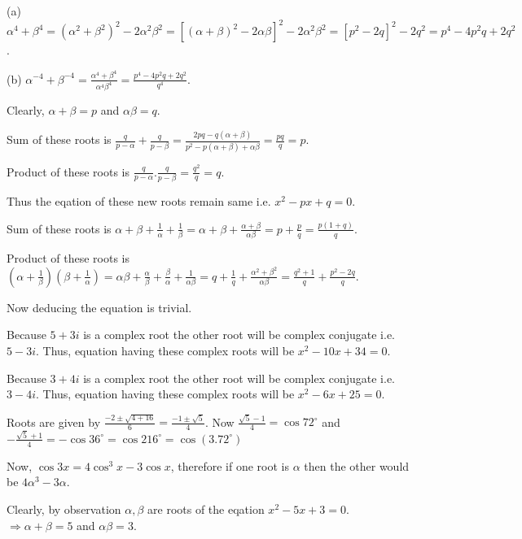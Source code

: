   (a) $\alpha^4 + \beta^4 = (\alpha^2 + \beta^2)^2 - 2\alpha^2\beta^2 = [(\alpha + \beta)^2 - 2\alpha\beta]^2
  - 2\alpha^2\beta^2 = [p^2 - 2q]^2 - 2q^2 = p^4 - 4p^2q + 2q^2$.

  (b) $\alpha^{-4} + \beta^{-4} = \frac{\alpha^4 + \beta^4}{\alpha^4\beta^4} = \frac{p^4 - 4p^2q +
    2q^2}{q^4}$.
\item Clearly, $\alpha + \beta = p$ and $\alpha\beta = q$.
  \startitemize[i]
  \item Sum of these roots is $\frac{q}{p - \alpha} + \frac{q}{p - \beta} = \frac{2pq - q(\alpha +
    \beta)}{p^2 - p(\alpha + \beta) + \alpha\beta} = \frac{pq}{q} = p$.

    Product of these roots is $\frac{q}{p - \alpha}.\frac{q}{p - \beta} = \frac{q^2}{q} = q$.

    Thus the eqation of these new roots remain same i.e. $x^2 - px + q = 0$.
  \item Sum of these roots is $\alpha + \beta + \frac{1}{\alpha} + \frac{1}{\beta} = \alpha + \beta +
    \frac{\alpha + \beta}{\alpha\beta} = p + \frac{p}{q} = \frac{p(1 + q)}{q}$.

    Product of these roots is $\left(\alpha + \frac{1}{\beta}\right)\left(\beta + \frac{1}{\alpha}\right) =
    \alpha\beta + \frac{\alpha}{\beta} + \frac{\beta}{\alpha} + \frac{1}{\alpha\beta} = q + \frac{1}{q} +
    \frac{\alpha^2 + \beta^2}{\alpha\beta} = \frac{q^2 + 1}{q} + \frac{p^2 - 2q}{q}$.

    Now deducing the equation is trivial.
  \stopitemize
\item Because $5 + 3i$ is a complex root the other root will be complex conjugate i.e. $5 - 3i$. Thus,
  equation having these complex roots will be $x^2 - 10x + 34 = 0$.
\item Because $3 + 4i$ is a complex root the other root will be complex conjugate i.e. $3 - 4i$. Thus,
  equation having these complex roots will be $x^2 - 6x + 25 = 0$.
\item Roots are given by $\frac{-2\pm\sqrt{4 + 16}}{6} = \frac{-1\pm\sqrt{5}}{4}$. Now $\frac{\sqrt{5} -
  1}{4} = \cos72^\circ$ and $-\frac{\sqrt{5} + 1}{4} = -\cos36^\circ = \cos216^\circ = \cos(3.72^\circ)$

  Now, $\cos3x = 4\cos^3x - 3\cos x$, therefore if one root is $\alpha$ then the other would be $4\alpha^3 -
  3\alpha$.
\item Clearly, by observation $\alpha, \beta$ are roots of the eqation $x^2 - 5x + 3 = 0$. $\Rightarrow
  \alpha + \beta = 5$ and $\alpha\beta = 3$.


